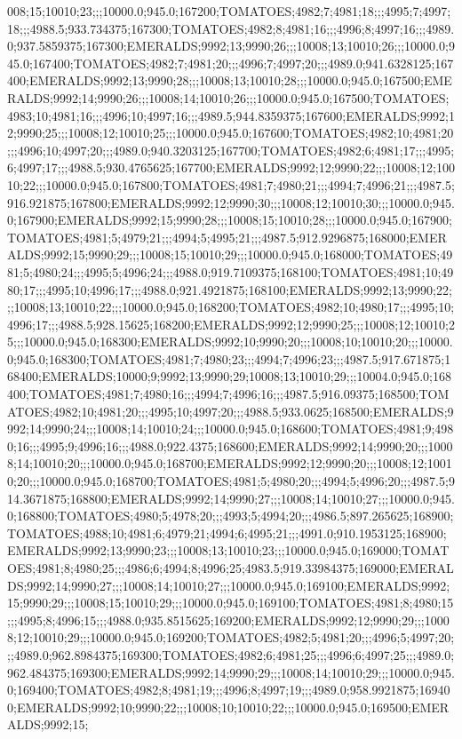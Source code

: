 008;15;10010;23;;;10000.0;945.0;167200;TOMATOES;4982;7;4981;18;;;4995;7;4997;18;;;4988.5;933.734375;167300;TOMATOES;4982;8;4981;16;;;4996;8;4997;16;;;4989.0;937.5859375;167300;EMERALDS;9992;13;9990;26;;;10008;13;10010;26;;;10000.0;945.0;167400;TOMATOES;4982;7;4981;20;;;4996;7;4997;20;;;4989.0;941.6328125;167400;EMERALDS;9992;13;9990;28;;;10008;13;10010;28;;;10000.0;945.0;167500;EMERALDS;9992;14;9990;26;;;10008;14;10010;26;;;10000.0;945.0;167500;TOMATOES;4983;10;4981;16;;;4996;10;4997;16;;;4989.5;944.8359375;167600;EMERALDS;9992;12;9990;25;;;10008;12;10010;25;;;10000.0;945.0;167600;TOMATOES;4982;10;4981;20;;;4996;10;4997;20;;;4989.0;940.3203125;167700;TOMATOES;4982;6;4981;17;;;4995;6;4997;17;;;4988.5;930.4765625;167700;EMERALDS;9992;12;9990;22;;;10008;12;10010;22;;;10000.0;945.0;167800;TOMATOES;4981;7;4980;21;;;4994;7;4996;21;;;4987.5;916.921875;167800;EMERALDS;9992;12;9990;30;;;10008;12;10010;30;;;10000.0;945.0;167900;EMERALDS;9992;15;9990;28;;;10008;15;10010;28;;;10000.0;945.0;167900;TOMATOES;4981;5;4979;21;;;4994;5;4995;21;;;4987.5;912.9296875;168000;EMERALDS;9992;15;9990;29;;;10008;15;10010;29;;;10000.0;945.0;168000;TOMATOES;4981;5;4980;24;;;4995;5;4996;24;;;4988.0;919.7109375;168100;TOMATOES;4981;10;4980;17;;;4995;10;4996;17;;;4988.0;921.4921875;168100;EMERALDS;9992;13;9990;22;;;10008;13;10010;22;;;10000.0;945.0;168200;TOMATOES;4982;10;4980;17;;;4995;10;4996;17;;;4988.5;928.15625;168200;EMERALDS;9992;12;9990;25;;;10008;12;10010;25;;;10000.0;945.0;168300;EMERALDS;9992;10;9990;20;;;10008;10;10010;20;;;10000.0;945.0;168300;TOMATOES;4981;7;4980;23;;;4994;7;4996;23;;;4987.5;917.671875;168400;EMERALDS;10000;9;9992;13;9990;29;10008;13;10010;29;;;10004.0;945.0;168400;TOMATOES;4981;7;4980;16;;;4994;7;4996;16;;;4987.5;916.09375;168500;TOMATOES;4982;10;4981;20;;;4995;10;4997;20;;;4988.5;933.0625;168500;EMERALDS;9992;14;9990;24;;;10008;14;10010;24;;;10000.0;945.0;168600;TOMATOES;4981;9;4980;16;;;4995;9;4996;16;;;4988.0;922.4375;168600;EMERALDS;9992;14;9990;20;;;10008;14;10010;20;;;10000.0;945.0;168700;EMERALDS;9992;12;9990;20;;;10008;12;10010;20;;;10000.0;945.0;168700;TOMATOES;4981;5;4980;20;;;4994;5;4996;20;;;4987.5;914.3671875;168800;EMERALDS;9992;14;9990;27;;;10008;14;10010;27;;;10000.0;945.0;168800;TOMATOES;4980;5;4978;20;;;4993;5;4994;20;;;4986.5;897.265625;168900;TOMATOES;4988;10;4981;6;4979;21;4994;6;4995;21;;;4991.0;910.1953125;168900;EMERALDS;9992;13;9990;23;;;10008;13;10010;23;;;10000.0;945.0;169000;TOMATOES;4981;8;4980;25;;;4986;6;4994;8;4996;25;4983.5;919.33984375;169000;EMERALDS;9992;14;9990;27;;;10008;14;10010;27;;;10000.0;945.0;169100;EMERALDS;9992;15;9990;29;;;10008;15;10010;29;;;10000.0;945.0;169100;TOMATOES;4981;8;4980;15;;;4995;8;4996;15;;;4988.0;935.8515625;169200;EMERALDS;9992;12;9990;29;;;10008;12;10010;29;;;10000.0;945.0;169200;TOMATOES;4982;5;4981;20;;;4996;5;4997;20;;;4989.0;962.8984375;169300;TOMATOES;4982;6;4981;25;;;4996;6;4997;25;;;4989.0;962.484375;169300;EMERALDS;9992;14;9990;29;;;10008;14;10010;29;;;10000.0;945.0;169400;TOMATOES;4982;8;4981;19;;;4996;8;4997;19;;;4989.0;958.9921875;169400;EMERALDS;9992;10;9990;22;;;10008;10;10010;22;;;10000.0;945.0;169500;EMERALDS;9992;15;
